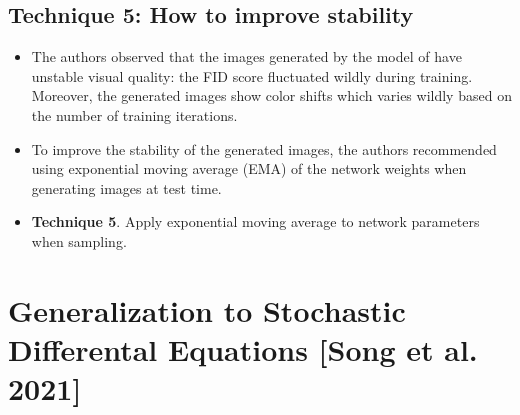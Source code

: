 \documentclass[10pt]{article}
\begin{document}
\subsection{Technique 5: How to improve stability}

\begin{itemize}
  \item The authors observed that the images generated by the model of \cite{Song:2019} have unstable visual quality: the FID score fluctuated wildly during training. Moreover, the generated images show color shifts which varies wildly based on the number of training iterations.
  
  \item To improve the stability of the generated images, the authors recommended using exponential moving average (EMA) of the network weights when generating images at test time.
  
  \item {\bf Technique 5}. Apply exponential moving average to network parameters when sampling.
\end{itemize}

\section{Generalization to Stochastic Differental Equations [Song et al. 2021]}
\end{document}
